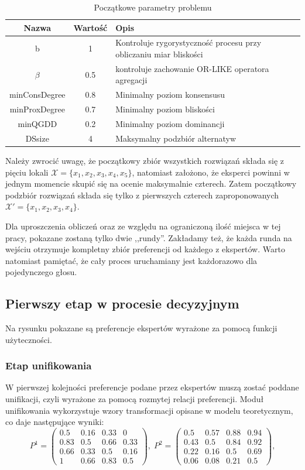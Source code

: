 \begin{table}[ht]
\caption{Początkowe parametry problemu}
\begin{tabularx}{\textwidth}{|c|c|X|}
\hline
Nazwa & Wartość & Opis \\
\hline
b & 1 & Kontroluje rygorystyczność procesu przy obliczaniu miar bliskości \\
\hline
$\beta$ & 0.5 & kontroluje zachowanie OR-LIKE operatora agregacji \\
\hline
minConsDegree & 0.8 & Minimalny poziom konsensusu \\
\hline
minProxDegree & 0.7 & Minimalny poziom bliskości \\
\hline
minQGDD & 0.2 & Minimalny poziom dominancji \\
\hline
DSsize & 4 & Maksymalny podzbiór alternatyw \\
\hline
\end{tabularx}
\label{tab:init_problem_params}
\end{table}

Należy zwrocić uwagę, że początkowy zbiór wszystkich rozwiązań składa się z
pięciu lokali $\mathcal{X} = \{ x_1, x_2, x_3, x_4, x_5\}$, natomiast założono,
że eksperci powinni w jednym momencie skupić się na ocenie maksymalnie czterech.
Zatem początkowy podzbiór rozwiązań składa się tylko z pierwszych czterech
zaproponowanych $\mathcal{X'} = \{ x_1, x_2, x_3, x_4\}$.

Dla uproszczenia obliczeń oraz ze względu na ograniczoną ilość miejsca w tej
pracy, pokazane zostaną tylko dwie ,,rundy''. Zakładamy też, że każda runda na
wejściu otrzymuje kompletny zbiór preferencji od każdego z ekspertów. 
Warto natomiast pamiętać, że cały proces uruchamiany jest każdorazowo dla
pojedynczego głosu. 

\subsection{Pierwszy etap w procesie decyzyjnym}
Na rysunku pokazane są preferencje ekspertów wyrażone za pomocą funkcji
użyteczności.

\subsubsection{Etap unifikowania}
W pierwszej kolejności preferencje podane przez ekspertów muszą zostać poddane
unifikacji, czyli wyrażone za pomocą rozmytej relacji preferencji. Moduł
unifikowania wykorzystuje wzory transformacji opisane w modelu teoretycznym, co
daje następujące wyniki:
$$
P^1 = 
\begin{pmatrix}
0.5  & 0.16  & 0.33  & 0    \\
0.83 & 0.5   & 0.66  & 0.33 \\
0.66 & 0.33  & 0.5   & 0.16 \\
1    & 0.66  & 0.83  & 0.5
\end{pmatrix},\;
P^2 = 
\begin{pmatrix}
0.5  & 0.57  & 0.88  & 0.94 \\
0.43 & 0.5   & 0.84  & 0.92 \\
0.22 & 0.16  & 0.5   & 0.69 \\
0.06 & 0.08  & 0.21  & 0.5
\end{pmatrix},
$$

